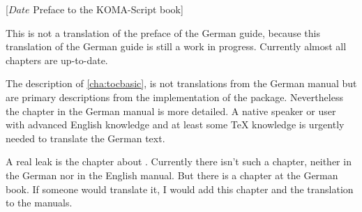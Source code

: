 %
%
%
%
%
%
%
%
%

                 [$Date$
                  Preface to the KOMA-Script book]



This is not a translation of the preface of the German \KOMAScript{} guide,
because this translation of the German \KOMAScript{} guide is still a work in
progress. Currently almost all chapters are up-to-date.

The description of \autoref{cha:tocbasic}, is not
translations from the German manual but are primary descriptions from the
implementation of the package. Nevertheless the chapter in the German manual
is more detailed. A native speaker or user with advanced English knowledge and
at least some \TeX{} knowledge is urgently needed to translate the German text.

A real leak is the chapter about . Currently there isn't such
a chapter, neither in the German nor in the English manual. But there is a
chapter at the German \KOMAScript{} book. If someone would translate it, I
would add this chapter and the translation to the manuals.

